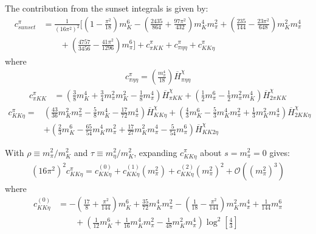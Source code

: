 \documentclass[12pt,a4paper]{article}
\begin{document}
The contribution from the sunset integrals is given by:
\begin{align}
	{c}^{\pi}_{sunset} &= \frac{1}{(16\pi^2)^2 } \bigg[ \left(1-\frac{\pi ^2}{18}\right) m_{K}^6-\left(\frac{2435}{864}+\frac{97 \pi ^2}{432}\right) m_{K}^4 m_{\pi}^2+\left(\frac{235}{144}-\frac{23 \pi ^2}{648}\right) m_{K}^2 m_{\pi}^4 \nonumber \\
	& \qquad + \left(\frac{4757}{3456}-\frac{41 \pi ^2}{1296}\right) m_{\pi}^6 \bigg]  + {c}^{\pi}_{\pi K K} + {c}^{\pi}_{\pi \eta \eta} + {c}^{\pi}_{K K \eta} \label{cSunsetGMO}
\end{align}
where
\begin{align}
	{c}^{\pi}_{\pi \eta \eta} = \left( \frac{m_{\pi}^4}{18} \right) \overline{H}^{\chi}_{\pi \eta \eta}
\label{cpee}
\end{align}
\begin{align}
	{c}^{\pi}_{\pi K K} & = \left( \frac{3}{8} m_{K}^4 + \frac{3}{4} m_{\pi}^2 m_{K}^2 - \frac{1}{8} m_{\pi}^4 \right) \overline{H}^{\chi}_{\pi K K} + \left( \frac{1}{2} m_{\pi}^6 - \frac{1}{2} m_{\pi}^2 m_{K}^4 \right) \overline{H}^{\chi}_{2\pi K K} 
\label{cpkk}
\end{align}
\begin{align}
	{c}^{\pi}_{K K \eta} =& \left( \frac{43}{36} m_{K}^2 m_{\pi}^2 -\frac{5}{8} m_{K}^4 - \frac{17}{72} m_{\pi}^4 \right) \overline{H}^{\chi}_{K K \eta} + \left( \frac{4}{3} m_{K}^6 - \frac{5}{3} m_{K}^4 m_{\pi}^2 + \frac{1}{3} m_{K}^2 m_{\pi}^4 \right) \overline{H}^{\chi}_{2K K \eta} \nonumber \\
	& + \left( \frac{2}{3} m_{K}^6 - \frac{65}{54} m_{K}^4 m_{\pi}^2 + \frac{17}{27} m_{K}^2 m_{\pi}^4 - \frac{5}{54} m_{\pi}^6 \right) \overline{H}^{\chi}_{K K 2\eta}
\label{ckkeGMO}
\end{align}

With $\rho \equiv m_{\pi}^2/m_{K}^2$ and $\tau \equiv m_{\eta}^2/m_{K}^2$, expanding ${c}^{\pi}_{K K \eta}$ about $s = m_{\pi}^2 = 0$ gives:
\begin{align}
	(16 \pi^2)^2 {c}^{\pi}_{K K \eta} = {c}_{K K \eta}^{(0)} + {c}_{K K \eta}^{(1)} (m_{\pi}^2) + {c}_{K K \eta}^{(2)} (m_{\pi}^2)^2 + \mathcal{O}((m_{\pi}^2)^3)
\end{align}
where
\begin{align}
	{c}_{K K \eta}^{(0)} &= -\left(\frac{17}{8}+\frac{\pi ^2}{144}\right) m_{K}^6 + \frac{35}{72} m_{K}^4 m_{\pi}^2 - \left( \frac{1}{18}-\frac{\pi^2}{144} \right) m_{K}^2 m_{\pi}^4 + \frac{1}{144} m_{\pi}^6 \nonumber \\
	& \qquad + \left(\frac{1}{12} m_{K}^6 +\frac{1}{16} m_{K}^4 m_{\pi}^2 - \frac{1}{48} m_{K}^2 m_{\pi}^4 \right) \log^2 \left[ \frac{4}{3} \right] 
\end{align}
\end{document}
